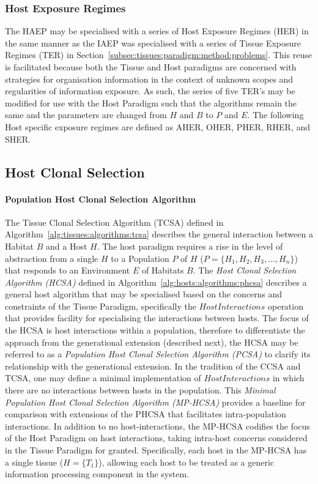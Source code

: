 %
%
\subsubsection{Host Exposure Regimes}
The HAEP may be specialised with a series of Host Exposure Regimes (HER) in the same manner as the IAEP was specialised with a series of Tissue Exposure Regimes (TER) in Section~\ref{subsec:tissues:paradigm:method:problems}. This reuse is facilitated because both the Tissue and Host paradigms are concerned with strategies for organisation information in the context of unknown scopes and regularities of information exposure. As such, the series of five TER's may be modified for use with the Host Paradigm such that the algorithms remain the same and the parameters are changed from $H$ and $B$ to $P$ and $E$. The following Host specific exposure regimes are defined as AHER, OHER, PHER, RHER, and SHER.

%
%
\subsection{Host Clonal Selection}
\label{subsec:hosts:paradigm:realised:algorithms}

%
%
\paragraph{Population Host Clonal Selection Algorithm}
The Tissue Clonal Selection Algorithm (TCSA) defined in Algorithm~\ref{alg:tissues:algorithms:tcsa} describes the general interaction between a Habitat $B$ and a Host $H$. The host paradigm requires a rise in the level of abstraction from a single $H$ to a Population $P$ of $H$ ($P = \{H_1, H_2, H_3, \ldots, H_n\}$) that responds to an Environment $E$ of Habitats $B$. The \emph{Host Clonal Selection Algorithm (HCSA)} defined in Algorithm~\ref{alg:hosts:algorithms:phcsa} describes a general host algorithm that may be specialised based on the concerns and constraints of the Tissue Paradigm, specifically the $HostInteractions$ operation that provides facility for specialising the interactions between hosts. The focus of the HCSA is host interactions within a population, therefore to differentiate the approach from the generational extension (described next), the HCSA may be referred to as a \emph{Population Host Clonal Selection Algorithm (PCSA)} to clarify its relationship with the generational extension.
In the tradition of the CCSA and TCSA, one may define a minimal implementation of $HostInteractions$ in which there are no interactions between hosts in the population. This \emph{Minimal Population Host Clonal Selection Algorithm (MP-HCSA)} provides a baseline for comparison with extensions of the PHCSA that facilitates intra-population interactions. 
In addition to no host-interactions, the MP-HCSA codifies the focus of the Host Paradigm on host interactions, taking intra-host concerns considered in the Tissue Paradigm for granted. Specifically, each host in the MP-HCSA has a single tissue ($H = \{T_1\}$), allowing each host to be treated as a generic information processing component in the system.

